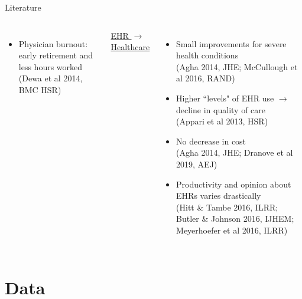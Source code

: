 \documentclass[10pt]{beamer}
\begin{document}
\begin{frame}[noframenumbering]{Literature}
\begin{columns}
\begin{itemize}
            \footnotesize
            
            \item Physician burnout: early retirement and less hours worked \\ \vspace{1mm} 
            \tiny (Dewa et al 2014, BMC HSR)
        \end{itemize}
        
        \centering
        \underline{ EHR $\rightarrow$ Healthcare }
        \vspace{-1mm}
        \begin{itemize}
            \item Small improvements for severe health conditions \\ \vspace{1mm}
            \tiny(Agha 2014, JHE; McCullough et al 2016, RAND)
            
            \footnotesize
            
            \item Higher ``levels" of EHR use $\rightarrow$ decline in quality of care\\ \vspace{1mm}
            \tiny (Appari et al 2013, HSR)
            
            \footnotesize 
            
            \item No decrease in cost \\ \vspace{1mm}
            \tiny (Agha 2014, JHE; Dranove et al 2019, AEJ) 
            
            \footnotesize
            
            \item Productivity and opinion about EHRs varies drastically \\ \vspace{1mm}
            \tiny (Hitt $\&$ Tambe 2016, ILRR; Butler $\&$ Johnson 2016, IJHEM; Meyerhoefer et al 2016, ILRR)
            
        \end{itemize}
        
\end{columns}
\end{frame}

\section{Data}
\end{document}
